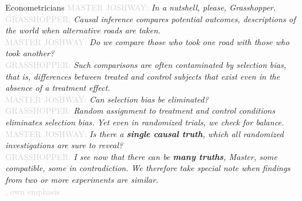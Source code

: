 \documentclass[aspectratio=169]{beamer}
\begin{document}
	\begin{frame}{Econometricians}
		\footnotesize{
		\textcolor{lightgray} {MASTER JOSHWAY:} \textit{In a nutshell, please, Grasshopper.} \\ \vspace*{.1cm}
		\textcolor{lightgray} {GRASSHOPPER:} \textit{Causal inference compares potential outcomes, descriptions of the world when alternative roads are taken.} \\ \vspace*{.1cm}
		\textcolor{lightgray} {MASTER JOSHWAY:} \textit{Do we compare those who took one road with those who took another?} \\ \vspace*{.1cm}
		\textcolor{lightgray} {GRASSHOPPER:} \textit{Such comparisons are often contaminated by selection bias, that is, differences between treated and control subjects that exist even in the absence of a treatment effect.} \\ \vspace*{.1cm}
		\textcolor{lightgray} {MASTER JOSHWAY:} \textit{Can selection bias be eliminated?} \\ \vspace*{.1cm}
		\textcolor{lightgray} {GRASSHOPPER:} \textit{Random assignment to treatment and control conditions eliminates selection bias. Yet even in randomized trials, we check for balance.} \\ \vspace*{.1cm}
		\textcolor{lightgray} {MASTER JOSHWAY:} \textit{Is there a \textbf{single causal truth}, which all randomized investigations are sure to reveal?} \\ \vspace*{.1cm}
		\textcolor{lightgray} {GRASSHOPPER:} \textit{I see now that there can be \textbf{many truths}, Master, some compatible, some in contradiction. We therefore take special note when findings from two or more experiments are similar.} \\ \vspace*{.2cm}}
		\textcolor{lightgray} {\scriptsize{\cite[(p. 30)]{Angrist2015}, own emphasis}}
	\end{frame}
\end{document}
